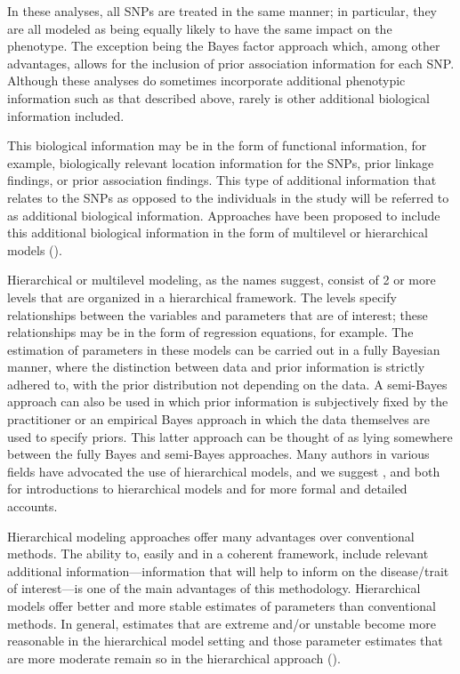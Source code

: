 \documentclass[oupdraft]{bio}
\begin{document}
In these analyses, all SNPs are treated in the same manner; in
particular, they are all modeled as being equally likely to have
the same impact on the phenotype. The exception being the Bayes
factor approach which, among other advantages, allows for the
inclusion of prior association information for each SNP. Although
these analyses do sometimes incorporate additional phenotypic
information such as that described above, rarely is other
additional biological information included.

This biological information may be in the form of functional
information, for example, biologically relevant location
information for the SNPs, prior linkage findings, or prior
association findings. This type of additional information
that relates to the SNPs as opposed to the individuals in the
study will be referred to as additional biological information.
Approaches have been proposed to include this additional
biological information in the form of multilevel or hierarchical
models
(\citealp{Duditetal02,rma2003,LW2004,rieger2004}).

Hierarchical or multilevel modeling, as the names suggest,
consist of 2 or more levels that are organized in a
hierarchical framework. The levels specify relationships between
the variables and parameters that are of interest; these
relationships may be in the form of regression equations, for
example. The estimation of parameters in these models can be
carried out in a fully Bayesian manner, where the distinction
between data and prior information is strictly adhered to, with
the prior distribution not depending on the data. A semi-Bayes
approach can also be used in which prior information is
subjectively fixed by the practitioner or an empirical Bayes
approach in which the data themselves are used to specify priors.
This latter approach can be thought of as lying somewhere between
the fully Bayes and semi-Bayes approaches. Many authors in
various fields have advocated the use of hierarchical models,
and we suggest
\citet{tomlins2005},
\citet{TTC01}
and
\citet{Barlow_Bartholomew:1972}
both for introductions to hierarchical models and for more
formal and detailed accounts.

Hierarchical modeling approaches offer many advantages over
conventional methods. The ability to, easily and in a coherent
framework, include relevant additional information---information
that will help to inform on the disease/trait of interest---is one
of the main advantages of this methodology. Hierarchical models
offer better and more stable estimates of parameters than
conventional methods. In general, estimates that are extreme
and/or unstable become more reasonable in the hierarchical model
setting and those parameter estimates that are more moderate
remain so in the hierarchical approach
(\citealp{Gichangi_Vach:2006}).
\end{document}
